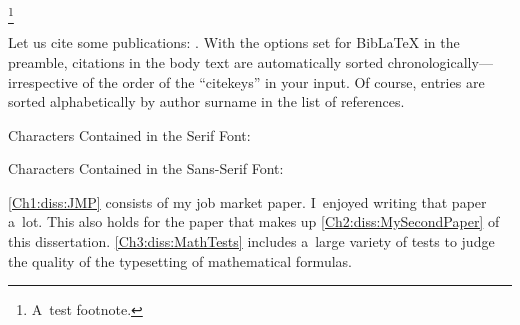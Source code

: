 


\makeatletter
\renewcommand{\@makefnmark}{{\sufigures\@makefnmarkorig}}
\makeatother

\blindtext[1]%
\unskip\unskip\unskip\footnote{A~test footnote.}

\knutext

Let us cite some publications: \cite{Andersen2008, Andreoni2012, Balakrishnan2016, Koszegi2013}. With the options set for BibLaTeX in the preamble, citations in the body text are automatically sorted chronologically---irrespective of the order of the ``citekeys'' in your input. Of course, entries are sorted alphabetically by author surname in the list of references.

\begin{table}[t!!!]
	\caption{Characters Contained in the Serif Font: \savermdefaultfortext}
	\rmfamily
	\makeatletter
	\xfonttable{\f@encoding}{\f@family}{\f@series}{\f@shape}
	\makeatother
\end{table}

\begin{table}[t!!!]
	\caption{Characters Contained in the Sans-Serif Font: \savesffamily}
	\sffamily
	\makeatletter
	\xfonttable{\f@encoding}{\f@family}{\f@series}{\f@shape}
	\makeatother
\end{table}

\Blindtext

\autoref{Ch1:diss:JMP} consists of my job market paper. I~enjoyed writing that paper a~lot. This also holds for the paper that makes up \autoref{Ch2:diss:MySecondPaper} of this dissertation. \autoref{Ch3:diss:MathTests} includes a~large variety of tests to judge the quality of the typesetting of mathematical formulas.
